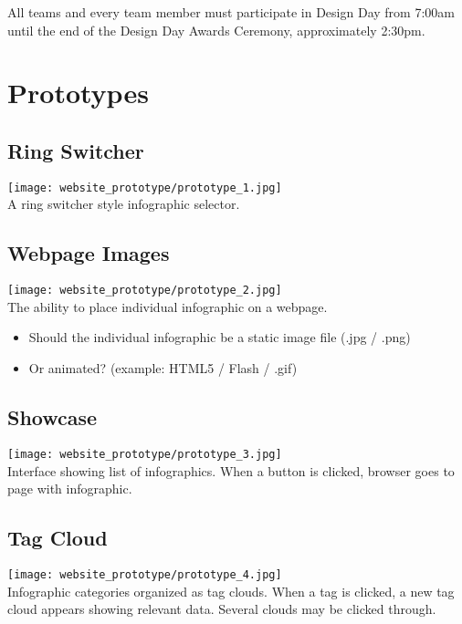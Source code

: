 \documentclass[11pt,a4paper,oneside]{article}
\begin{document}
All teams and every team member must participate in Design Day from 7:00am until the end of the Design Day Awards Ceremony, approximately 2:30pm.\\


\section {Prototypes}
\subsection{Ring Switcher}
\texttt{[image: website\_prototype/prototype\_1.jpg]}\\
A ring switcher style infographic selector.  

\subsection{Webpage Images}
\texttt{[image: website\_prototype/prototype\_2.jpg]}\\
The ability to place individual infographic on a webpage.\\
\begin{itemize}
\item Should the individual infographic be a static image file (.jpg / .png)\\
\item Or animated? (example: HTML5 / Flash / .gif)\\
\end{itemize}

\subsection{Showcase}
\texttt{[image: website\_prototype/prototype\_3.jpg]}\\
Interface showing list of infographics.  When a button is clicked, browser goes to page with infographic.\\

\subsection{Tag Cloud}
\texttt{[image: website\_prototype/prototype\_4.jpg]}\\
Infographic categories organized as tag clouds.  When a tag is clicked, a new tag cloud appears showing relevant data.  Several clouds may be clicked through.\\
\end{document}
